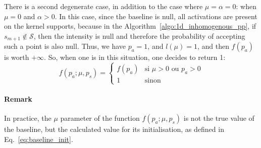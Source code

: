 There is a second degenerate case, in addition to the case where $\mu = \alpha = 0$: when $\mu = 0$ and $\alpha > 0$.
In this case, since the baseline is null, all activations are present on the kernel supports, because in the Algorithm~\ref{algo:1d_inhomogenous_pp}, if $s_{m+1} \notin \mathcal{S}$, then the intensity is null and therefore the probability of accepting such a point is also null.
Thus, we have $p_a = 1$, and $l(\mu) = 1$, and then $f(p_a)$ is worth $+\infty$.
So, when one is in this situation, one decides to return 1:
\begin{equation}
    f(p_a ; \mu, p_s) = 
    \left\{
		\begin{array}{ll}
			f(p_a) & \mbox{si } \mu > 0 \text{ ou } p_a > 0 \\
			1 & \mbox{sinon}
		\end{array}
	\right.
\end{equation}

\paragraph{Remark} In practice, the $\mu$ parameter of the function $f(p_a; \mu, p_s)$ is not the true value of the baseline, but the calculated value for its initialisation, as defined in Eq.~\eqref{eq:baseline_init}.


